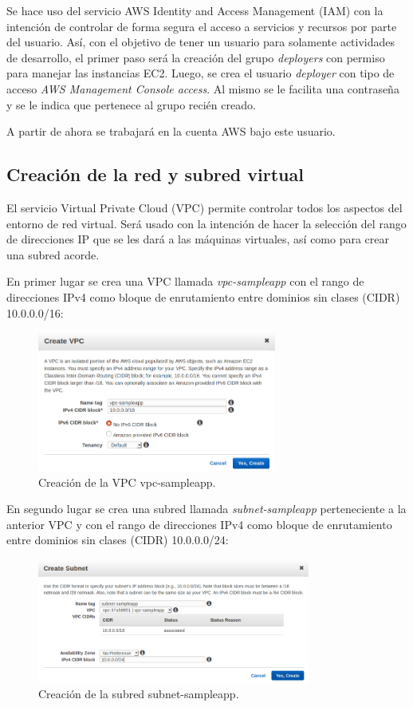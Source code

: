 Se hace uso del servicio AWS Identity and Access Management (IAM) con la intención de controlar de forma segura el acceso a servicios y recursos por parte del usuario. Así, con el objetivo de tener un usuario para solamente actividades de desarrollo, el primer paso será la creación del grupo \textit{deployers} con permiso para manejar las instancias EC2. Luego, se crea el usuario \textit{deployer} con tipo de acceso \textit{AWS Management Console access}. Al mismo se le facilita una contraseña y se le indica que pertenece al grupo recién creado.

A partir de ahora se trabajará en la cuenta AWS bajo este usuario.

\subsection{Creación de la red y subred virtual}

El servicio Virtual Private Cloud (VPC) permite controlar todos los aspectos del entorno de red virtual. Será usado con la intención de hacer la selección del rango de direcciones IP que se les dará a las máquinas virtuales, así como para crear una subred acorde.

En primer lugar se crea una VPC llamada \textit{vpc-sampleapp} con el rango de direcciones IPv4 como bloque de enrutamiento entre dominios sin clases (CIDR) 10.0.0.0/16:

\begin{figure}[H]
\centering
\includegraphics[width=0.7\textwidth]{images/figures/vpc-sampleapp.png}
\caption{Creación de la VPC vpc-sampleapp.\label{fig:figure_placement_example}}
\end{figure}

En segundo lugar se crea una subred llamada \textit{subnet-sampleapp} perteneciente a la anterior VPC y con el rango de direcciones IPv4 como bloque de enrutamiento entre dominios sin clases (CIDR) 10.0.0.0/24:

\begin{figure}[H]
\centering
\includegraphics[width=0.8\textwidth]{images/figures/subnet-sampleapp.png}
\caption{Creación de la subred subnet-sampleapp.\label{fig:figure_placement_example}}
\end{figure}

